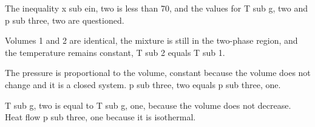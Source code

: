 The inequality x sub ein, two is less than 70, and the values for T sub g, two and p sub three, two are questioned.

Volumes 1 and 2 are identical, the mixture is still in the two-phase region, and the temperature remains constant, T sub 2 equals T sub 1.

The pressure is proportional to the volume, constant because the volume does not change and it is a closed system. p sub three, two equals p sub three, one.

T sub g, two is equal to T sub g, one, because the volume does not decrease. Heat flow p sub three, one because it is isothermal.
